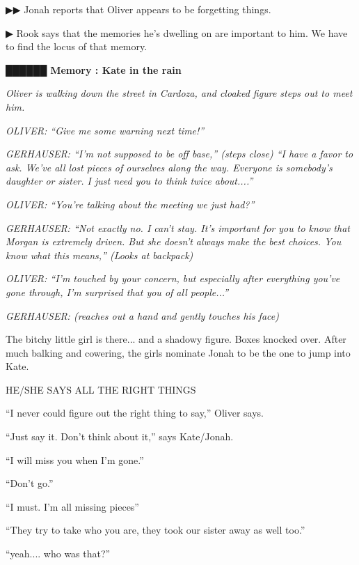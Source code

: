  {\color[RGB]{68,68,68}▶▶ } Jonah reports that Oliver appears to be forgetting things.

 {\color[RGB]{68,68,68}▶ } Rook says that the memories he's dwelling on are important to him.  We have to find the locus of that memory.





 {\LARGE \textbf{ {\color[RGB]{51,51,51}██████} } }  {\LARGE \textbf{ Memory : Kate in the rain} } 



\textit{Oliver is walking down the street in Cardoza, and cloaked figure steps out to meet him.}

\textit{OLIVER: ``Give me some warning next time!''}

\textit{GERHAUSER: ``I'm not supposed to be off base,'' (steps close) ``I have a favor to ask.  We've all lost pieces of ourselves along the way.  Everyone is somebody's daughter or sister.  I just need you to think twice about....''}

\textit{OLIVER: ``You're talking about the meeting we just had?''}

\textit{GERHAUSER: ``Not exactly no.  I can't stay.  It's important for you to know that Morgan is extremely driven.  But she doesn't always make the best choices.  You know what this means,'' (Looks at backpack)}

\textit{OLIVER: ``I'm touched by your concern, but especially after everything you've gone through, I'm surprised that you of all people...''}

\textit{GERHAUSER: (reaches out a hand and gently touches his face) }



The bitchy little girl is there... and a shadowy figure.  Boxes knocked over. After much balking and cowering, the girls nominate Jonah to be the one to jump into Kate.

HE/SHE SAYS ALL THE RIGHT THINGS

``I never could figure out the right thing to say,'' Oliver says.

``Just say it.  Don't think about it,'' says Kate/Jonah.

``I will miss you when I'm gone.''

``Don't go.''

``I must.  I'm all missing pieces''

``They try to take who you are, they took our sister away as well too.''

``yeah.... who was that?''

